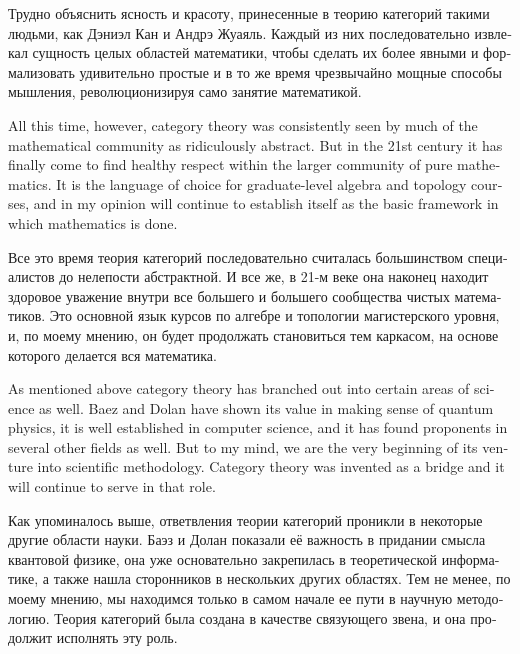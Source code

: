 \documentclass[a4paper]{book}
\theoremstyle{myth}
\begin{document}
\begin{english}
\begin{russian}Трудно объяснить ясность и красоту, принесенные в теорию категорий такими людьми, как Дэниэл Кан и Андрэ Жуаяль. Каждый из них последовательно извлекал сущность целых областей математики, чтобы сделать их более явными и формализовать удивительно простые и в то же время чрезвычайно мощные способы мышления, революционизируя само занятие математикой. \end{russian}

All this time, however, category theory was consistently seen by much of the mathematical community as ridiculously abstract. But in the 21st century it has finally come to find healthy respect within the larger community of pure mathematics. It is the language of choice for graduate-level algebra and topology courses, and in my opinion will continue to establish itself as the basic framework in which mathematics is done.

\begin{russian}Все это время теория категорий последовательно считалась большинством специалистов до нелепости абстрактной. И все же, в 21-м веке она наконец находит здоровое уважение внутри все большего и большего сообщества чистых математиков. Это основной язык курсов по алгебре и топологии магистерского уровня, и, по моему мнению, он будет продолжать становиться тем каркасом, на основе которого делается вся математика. \end{russian}

As mentioned above category theory has branched out into certain areas of science as well. Baez and Dolan have shown its value in making sense of quantum physics, it is well established in computer science, and it has found proponents in several other fields as well. But to my mind, we are the very beginning of its venture into scientific methodology. Category theory was invented as a bridge and it will continue to serve in that role.

\begin{russian}Как упоминалось выше, ответвления теории категорий проникли в некоторые другие области науки. Баэз и Долан показали её важность в придании смысла квантовой физике, она уже основательно закрепилась в теоретической информатике, а также нашла сторонников в нескольких других областях. Тем не менее, по моему мнению, мы находимся только в самом начале ее пути в научную методологию. Теория категорий была создана в качестве связующего звена, и она продолжит исполнять эту роль. \end{russian}


\end{english}
\end{document}
